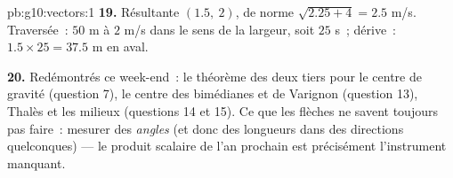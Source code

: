 \begin{solution}{pb:g10:vectors:1}
\textbf{19.} Résultante $(1.5,\ 2)$, de norme
$\sqrt{2.25 + 4} = 2.5$ m/s. Traversée~: $50$ m à $2$ m/s dans le
sens de la largeur, soit $25$ s~; dérive~: $1.5 \times 25 = 37.5$ m
en aval.

\textbf{20.} Redémontrés ce week-end~: le théorème des deux tiers
pour le centre de gravité (question 7), le centre des bimédianes et
de Varignon (question 13), Thalès et les milieux (questions 14 et
15). Ce que les flèches ne savent toujours pas faire~: mesurer des
\emph{angles} (et donc des longueurs dans des directions
quelconques) --- le produit scalaire de l'an prochain est précisément
l'instrument manquant.
\end{solution}
